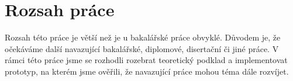
\section{Rozsah práce}
Rozsah této práce je větší než je u bakalářské práce obvyklé. Důvodem je, že očekáváme další navazující bakalářské, diplomové, disertační či jiné práce. V rámci této práce jsme se rozhodli rozebrat teoretický podklad a implementovat prototyp, na kterém jsme ověřili, že navazující práce mohou téma dále rozvíjet. 

